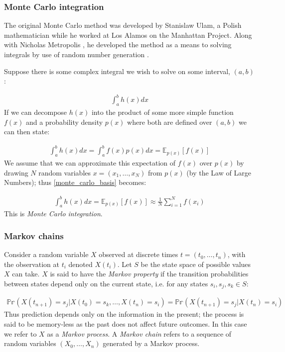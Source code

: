 \documentclass[11pt]{article} %
\begin{document}
\subsubsection{Monte Carlo integration}
The original Monte Carlo method was developed by Stanislaw Ulam, a Polish mathematician while he worked at Los Alamos on the Manhattan Project. Along with Nicholas Metropolis \cite{CooperCardinalsChaosReflection1989}, he developed the method as a means to solving integrals by use of random number generation \cite{MetropolisMonteCarloMethod1949}.

Suppose there is some complex integral we wish to solve on some interval, $(a,b)$:

\begin{align}
\int_a^b h(x) dx
\end{align}
If we can decompose $h(x)$ into the product of some more simple function $f(x)$ and a probability density $p(x)$ where both are defined over $(a,b)$ we can then state:

\begin{align} \label{monte_carlo_basis}
\int_a^bh(x)dx = \int_a^bf(x)p(x)dx = \mathbb{E}_{p(x)}\left[f(x)\right]
\end{align}
We assume that we can approximate this expectation of $f(x)$ over $p(x)$ by drawing $N$ random variables $x = (x_1,\ldots,x_N)$ from $p(x)$ (by the Law of Large Numbers); thus \eqref{monte_carlo_basis} becomes:

\begin{align} \label{monte_carlo_integration}
\int_a^bh(x)dx = \mathbb{E}_{p(x)}\left[f(x)\right] \approx \frac{1}{N}\sum_{i=1}^Nf(x_i)
\end{align}
This is \emph{Monte Carlo integration}.

\subsubsection{Markov chains}
Consider a random variable $X$ observed at discrete times $t = (t_0,\ldots,t_n)$, with the observation at $t_i$ denoted $X(t_i)$. Let $S$ be the state space of possible values $X$ can take. $X$ is said to have the \emph{Markov property} if the transition probabilities between states depend only on the current state, i.e. for any states $s_i, s_j, s_k \in S$:

\begin{align}
\mathbb{Pr}(X(t_{n+1}) = s_j | X(t_0) = s_k, \ldots, X(t_n) = s_i) = \mathbb{Pr}(X(t_{n+1}) = s_j | X(t_n) = s_i) 
\end{align}
Thus prediction depends only on the information in the present; the process is said to be memory-less as the past does not affect future outcomes. In this case we refer to $X$ as a \emph{Markov process}. A \emph{Markov chain} refers to a sequence of random variables $(X_0,\ldots,X_n)$ generated by a Markov process.
\end{document}
